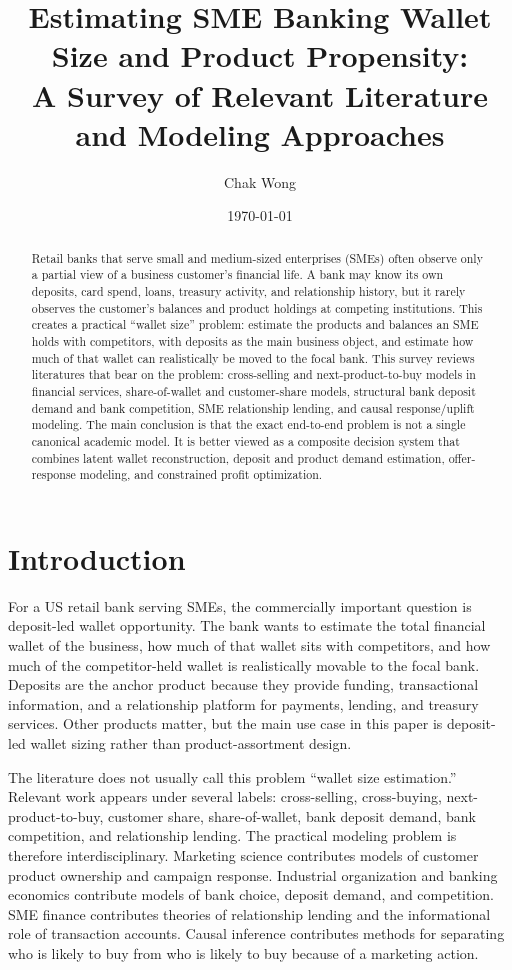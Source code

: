 \documentclass[11pt]{article}
\title{Estimating SME Banking Wallet Size and Product Propensity:\\
A Survey of Relevant Literature and Modeling Approaches}
\author{Chak Wong}
\date{\today}
\begin{document}
\maketitle

\begin{abstract}
Retail banks that serve small and medium-sized enterprises (SMEs) often observe
only a partial view of a business customer's financial life. A bank may know its
own deposits, card spend, loans, treasury activity, and relationship history, but
it rarely observes the customer's balances and product holdings at competing
institutions. This creates a practical ``wallet size'' problem: estimate the
products and balances an SME holds with competitors, with deposits as the main
business object, and estimate how much of that wallet can realistically be moved
to the focal bank. This survey
reviews literatures that bear on the problem: cross-selling and next-product-to-buy
models in financial services, share-of-wallet and customer-share models,
structural bank deposit demand and bank competition, SME relationship lending,
and causal response/uplift modeling. The main conclusion is that the exact
end-to-end problem is not a single canonical academic model. It is better viewed
as a composite decision system that combines latent wallet reconstruction,
deposit and product demand estimation, offer-response modeling, and constrained
profit optimization.
\end{abstract}

\section{Introduction}

For a US retail bank serving SMEs, the commercially important question is
deposit-led wallet opportunity. The bank wants to estimate the total financial
wallet of the business, how much of that wallet sits with competitors, and how
much of the competitor-held wallet is realistically movable to the focal bank.
Deposits are the anchor product because they provide funding,
transactional information, and a relationship platform for payments, lending,
and treasury services. Other products matter, but the main use case in this
paper is deposit-led wallet sizing rather than product-assortment design.

The literature does not usually call this problem ``wallet size estimation.''
Relevant work appears under several labels: cross-selling, cross-buying,
next-product-to-buy, customer share, share-of-wallet, bank deposit demand,
bank competition, and relationship lending. The practical modeling problem is
therefore interdisciplinary. Marketing science contributes models of customer
product ownership and campaign response. Industrial organization and banking
economics contribute models of bank choice, deposit demand, and competition.
SME finance contributes theories of relationship lending and the informational
role of transaction accounts. Causal inference contributes methods for separating
who is likely to buy from who is likely to buy because of a marketing action.
\end{document}
